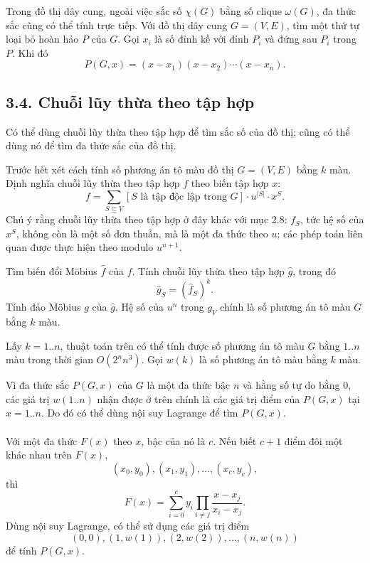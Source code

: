 \documentclass[11pt]{article}
\begin{document}
Trong đồ thị dây cung, ngoài việc sắc số \(\chi(G)\) bằng số clique
\(\omega(G)\), đa thức sắc cũng có thể tính trực tiếp. Với đồ thị dây cung
\(G=(V,E)\), tìm một thứ tự loại bỏ hoàn hảo \(P\) của \(G\). Gọi \(x_i\) là
số đỉnh kề với đỉnh \(P_i\) và đứng sau \(P_i\) trong \(P\). Khi đó
\[
  P(G,x)=(x-x_1)(x-x_2)\cdots(x-x_n).
\]

\subsection*{3.4. Chuỗi lũy thừa theo tập hợp}

Có thể dùng chuỗi lũy thừa theo tập hợp để tìm sắc số của đồ thị; cũng có thể
dùng nó để tìm đa thức sắc của đồ thị.

Trước hết xét cách tính số phương án tô màu đồ thị \(G=(V,E)\) bằng \(k\) màu.
Định nghĩa chuỗi lũy thừa theo tập hợp \(f\) theo biến tập hợp \(x\):
\[
  f=\sum_{S\subseteq V}[S\text{ là tập độc lập trong }G]\cdot u^{|S|}\cdot x^S.
\]
Chú ý rằng chuỗi lũy thừa theo tập hợp ở đây khác với mục 2.8: \(f_S\), tức
hệ số của \(x^S\), không còn là một số đơn thuần, mà là một đa thức theo
\(u\); các phép toán liên quan được thực hiện theo modulo \(u^{n+1}\).

Tìm biến đổi Möbius \(\widehat f\) của \(f\). Tính chuỗi lũy thừa theo tập
hợp \(\widehat g\), trong đó
\[
  \widehat g_S=(\widehat f_S)^k.
\]
Tính đảo Möbius \(g\) của \(\widehat g\). Hệ số của \(u^n\) trong \(g_V\)
chính là số phương án tô màu \(G\) bằng \(k\) màu.

Lấy \(k=1..n\), thuật toán trên có thể tính được số phương án tô màu \(G\)
bằng \(1..n\) màu trong thời gian \(O(2^n n^3)\). Gọi \(w(k)\) là số phương án
tô màu bằng \(k\) màu.

Vì đa thức sắc \(P(G,x)\) của \(G\) là một đa thức bậc \(n\) và hằng số tự do
bằng \(0\), các giá trị \(w(1..n)\) nhận được ở trên chính là các giá trị điểm
của \(P(G,x)\) tại \(x=1..n\). Do đó có thể dùng nội suy Lagrange để tìm
\(P(G,x)\).

\paragraph{}
Với một đa thức \(F(x)\) theo \(x\), bậc của nó là \(c\). Nếu biết \(c+1\)
điểm đôi một khác nhau trên \(F(x)\),
\[
  (x_0,y_0),(x_1,y_1),\ldots,(x_c,y_c),
\]
thì
\[
  F(x)=\sum_{i=0}^{c} y_i\prod_{i\ne j}\frac{x-x_j}{x_i-x_j}.
\]
Dùng nội suy Lagrange, có thể sử dụng các giá trị điểm
\[
  (0,0),(1,w(1)),(2,w(2)),\ldots,(n,w(n))
\]
để tính \(P(G,x)\).
\end{document}

